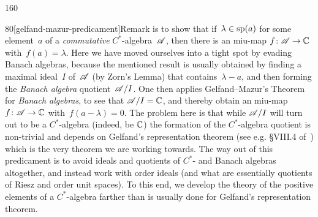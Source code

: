 \begin{parsec}{160}
\begin{point}{80}[gelfand-mazur-predicament]{Remark}
is to show that if~$\lambda\in\mathrm{sp}(a)$
for some element~$a$ of a \emph{commutative} $C^*$-algebra~$\mathscr{A}$,
then there is an miu-map $f\colon \mathscr{A}\to \mathbb{C}$
with~$f(a)=\lambda$.
Here we have moved ourselves into a tight spot
by evading Banach algebras,
because the mentioned result is usually obtained
by finding a maximal ideal~$I$ of~$\mathscr{A}$
(by Zorn's Lemma) that contains~$\lambda-a$,
and then forming the \emph{Banach algebra} quotient~$\mathscr{A}/I$.
One then applies Gelfand--Mazur's Theorem for \emph{Banach algebras}, 
to see that
$\mathscr{A}/I= \mathbb{C}$,
and thereby obtain an miu-map~$f\colon \mathscr{A}\to \mathbb{C}$ with~$f(a-\lambda)=0$.
The problem here is that while $\mathscr{A}/I$
will turn out to be a $C^*$-algebra (indeed, be $\mathbb{C}$)
the formation of the $C^*$-algebra quotient
is non-trivial and depends on Gelfand's representation theorem
(see e.g. \S{}VIII.4 of~\cite{conway2013}) 
which is the very theorem we are working towards.
The way out of this predicament
is to avoid ideals and quotients of $C^*$- and Banach algebras
altogether,
and instead work 
with order ideals (and what are essentially
 quotients of Riesz and order unit spaces).
To this end,
we develop the theory
of the positive elements of a $C^*$-algebra
farther than is usually done
for Gelfand's representation theorem.
\end{point}
\end{parsec}
